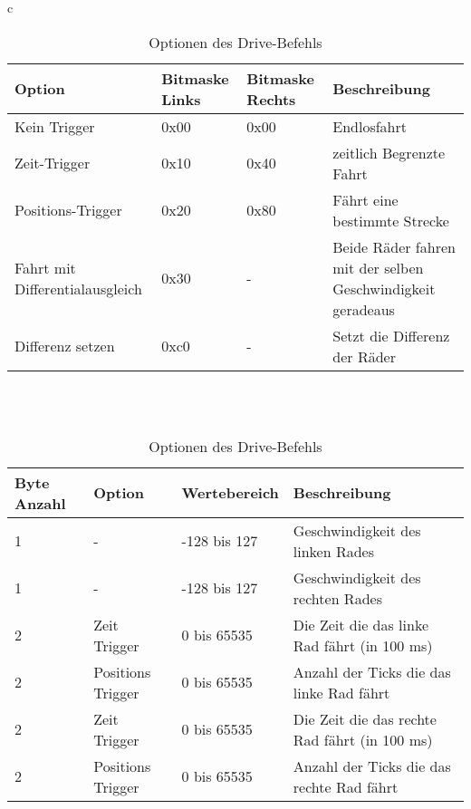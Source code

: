 \begin{table}[htb]
\begin{center}
	\begin{tabular}{c}
	\begin{tabularx}{\linewidth}{|X|l|l|X|}
		\hline
		\textbf{Option} & \textbf{Bitmaske Links} & \textbf{Bitmaske Rechts} & \textbf{Beschreibung} \\
		\hline \hline
		Kein Trigger	& 0x00						   & 0x00						   & Endlosfahrt \\ \hline
		Zeit-Trigger	& 0x10						   & 0x40						   & zeitlich Begrenzte Fahrt\\ \hline
		Positions-Trigger & 0x20					   & 0x80						   & Fährt eine bestimmte Strecke \\ \hline
		Fahrt mit Differentialausgleich & 0x30		   & -						   & Beide Räder fahren mit der selben Geschwindigkeit geradeaus \\ \hline
		Differenz setzen & 0xc0					   	   & -						   & Setzt die Differenz der Räder \\ \hline
	\end{tabularx}\\
	\\
	\begin{tabularx}{\linewidth}{|l|l|l|X|}
		\hline
		\textbf{Byte Anzahl} & \textbf{Option} & \textbf{Wertebereich} & \textbf{Beschreibung} \\
		\hline
		\hline
		1					 & - & -128 bis 127 & Geschwindigkeit des linken Rades \\
		\hline
		1					 & - & -128 bis 127 & Geschwindigkeit des rechten Rades\\
		\hline
		2					 & Zeit Trigger & 0 bis 65535 &  Die Zeit die das linke Rad fährt (in 100 ms)\\
		\hline
		2					 & Positions Trigger & 0 bis 65535 &  Anzahl der Ticks die das linke Rad fährt\\
		\hline
		2					 & Zeit Trigger & 0 bis 65535 &  Die Zeit die das rechte Rad fährt (in 100 ms)\\
		\hline
		2					 & Positions Trigger & 0 bis 65535 &  Anzahl der Ticks die das rechte Rad fährt\\
		\hline
	\end{tabularx}
	\end{tabular}
	\caption{\label{protocol_drive} Optionen des Drive-Befehls}
\end{center}
\end{table}

